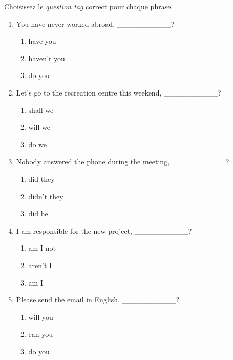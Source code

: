 \documentclass[11pt]{article}
\begin{document}
\begin{exercice}
Choisissez le \textit{question tag} correct pour chaque phrase.
\begin{enumerate}
    \item You have never worked abroad, \_\_\_\_\_\_\_\_\_\_?
          \begin{enumerate}
              \item have you
              \item haven't you
              \item do you
          \end{enumerate}
    \item Let's go to the recreation centre this weekend, \_\_\_\_\_\_\_\_\_\_?
          \begin{enumerate}
              \item shall we
              \item will we
              \item do we
          \end{enumerate}
    \item Nobody answered the phone during the meeting, \_\_\_\_\_\_\_\_\_\_?
          \begin{enumerate}
              \item did they
              \item didn't they
              \item did he
          \end{enumerate}
    \item I am responsible for the new project, \_\_\_\_\_\_\_\_\_\_?
          \begin{enumerate}
              \item am I not
              \item aren't I
              \item am I
          \end{enumerate}
    \item Please send the email in English, \_\_\_\_\_\_\_\_\_\_?
          \begin{enumerate}
              \item will you
              \item can you
              \item do you
          \end{enumerate}
\end{enumerate}
\end{exercice}
\end{document}
